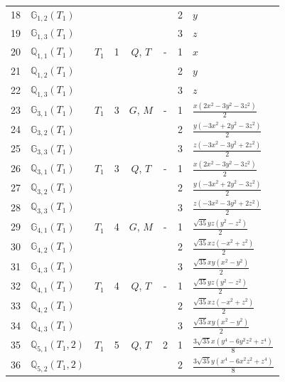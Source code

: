 \documentclass[fleqn,10pt,landscape]{jsarticle}
\begin{document}
\begin{longtable}[l]{clcccccl}
18 & $\mathbb{G}_{1,2}(T_{1})$ &  &  &  &  & 2 & $y$ \\
19 & $\mathbb{G}_{1,3}(T_{1})$ &  &  &  &  & 3 & $z$ \\ \hline
20 & $\mathbb{Q}_{1,1}(T_{1})$ & $T_{1}$ & 1 & $Q$, $T$ & - & 1 & $x$ \\
21 & $\mathbb{Q}_{1,2}(T_{1})$ &  &  &  &  & 2 & $y$ \\
22 & $\mathbb{Q}_{1,3}(T_{1})$ &  &  &  &  & 3 & $z$ \\ \hline
23 & $\mathbb{G}_{3,1}(T_{1})$ & $T_{1}$ & 3 & $G$, $M$ & - & 1 & $\frac{x \left(2 x^{2} - 3 y^{2} - 3 z^{2}\right)}{2}$ \\
24 & $\mathbb{G}_{3,2}(T_{1})$ &  &  &  &  & 2 & $\frac{y \left(- 3 x^{2} + 2 y^{2} - 3 z^{2}\right)}{2}$ \\
25 & $\mathbb{G}_{3,3}(T_{1})$ &  &  &  &  & 3 & $\frac{z \left(- 3 x^{2} - 3 y^{2} + 2 z^{2}\right)}{2}$ \\ \hline
26 & $\mathbb{Q}_{3,1}(T_{1})$ & $T_{1}$ & 3 & $Q$, $T$ & - & 1 & $\frac{x \left(2 x^{2} - 3 y^{2} - 3 z^{2}\right)}{2}$ \\
27 & $\mathbb{Q}_{3,2}(T_{1})$ &  &  &  &  & 2 & $\frac{y \left(- 3 x^{2} + 2 y^{2} - 3 z^{2}\right)}{2}$ \\
28 & $\mathbb{Q}_{3,3}(T_{1})$ &  &  &  &  & 3 & $\frac{z \left(- 3 x^{2} - 3 y^{2} + 2 z^{2}\right)}{2}$ \\ \hline
29 & $\mathbb{G}_{4,1}(T_{1})$ & $T_{1}$ & 4 & $G$, $M$ & - & 1 & $\frac{\sqrt{35} y z \left(y^{2} - z^{2}\right)}{2}$ \\
30 & $\mathbb{G}_{4,2}(T_{1})$ &  &  &  &  & 2 & $\frac{\sqrt{35} x z \left(- x^{2} + z^{2}\right)}{2}$ \\
31 & $\mathbb{G}_{4,3}(T_{1})$ &  &  &  &  & 3 & $\frac{\sqrt{35} x y \left(x^{2} - y^{2}\right)}{2}$ \\ \hline
32 & $\mathbb{Q}_{4,1}(T_{1})$ & $T_{1}$ & 4 & $Q$, $T$ & - & 1 & $\frac{\sqrt{35} y z \left(y^{2} - z^{2}\right)}{2}$ \\
33 & $\mathbb{Q}_{4,2}(T_{1})$ &  &  &  &  & 2 & $\frac{\sqrt{35} x z \left(- x^{2} + z^{2}\right)}{2}$ \\
34 & $\mathbb{Q}_{4,3}(T_{1})$ &  &  &  &  & 3 & $\frac{\sqrt{35} x y \left(x^{2} - y^{2}\right)}{2}$ \\ \hline
35 & $\mathbb{Q}_{5,1}(T_{1},2)$ & $T_{1}$ & 5 & $Q$, $T$ & 2 & 1 & $\frac{3 \sqrt{35} x \left(y^{4} - 6 y^{2} z^{2} + z^{4}\right)}{8}$ \\
36 & $\mathbb{Q}_{5,2}(T_{1},2)$ &  &  &  &  & 2 & $\frac{3 \sqrt{35} y \left(x^{4} - 6 x^{2} z^{2} + z^{4}\right)}{8}$ \\

\end{longtable}
\end{document}
